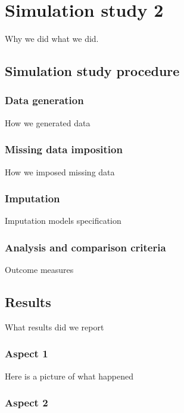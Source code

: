 \documentclass[a4paper,man,floatsintext,natbib]{apa6}\usepackage[]{graphicx}\usepackage[]{xcolor}
\begin{document}
    
\section{Simulation study 2}

	Why we did what we did.

\subsection{Simulation study procedure}

\subsubsection{Data generation}

	How we generated data	

\subsubsection{Missing data imposition}\label{sub-missing}

	How we imposed missing data	

\subsubsection{Imputation}

	Imputation models specification

\subsubsection{Analysis and comparison criteria}\label{criteria}

	Outcome measures

\subsection{Results}
	
	What results did we report

\subsubsection{Aspect 1}

	Here is a picture of what happened

\subsubsection{Aspect 2}
\end{document}
